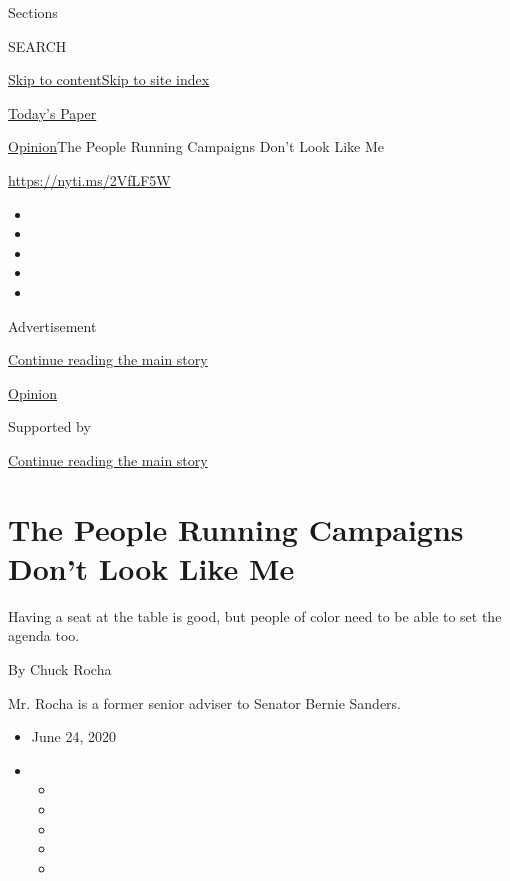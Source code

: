 Sections

SEARCH

\protect\hyperlink{site-content}{Skip to
content}\protect\hyperlink{site-index}{Skip to site index}

\href{https://myaccount.nytimes3xbfgragh.onion/auth/login?response_type=cookie\&client_id=vi}{}

\href{https://www.nytimes3xbfgragh.onion/section/todayspaper}{Today's
Paper}

\href{/section/opinion}{Opinion}\textbar{}The People Running Campaigns
Don't Look Like Me

\url{https://nyti.ms/2VfLF5W}

\begin{itemize}
\item
\item
\item
\item
\item
\end{itemize}

Advertisement

\protect\hyperlink{after-top}{Continue reading the main story}

\href{/section/opinion}{Opinion}

Supported by

\protect\hyperlink{after-sponsor}{Continue reading the main story}

\hypertarget{the-people-running-campaigns-dont-look-like-me}{%
\section{The People Running Campaigns Don't Look Like
Me}\label{the-people-running-campaigns-dont-look-like-me}}

Having a seat at the table is good, but people of color need to be able
to set the agenda too.

By Chuck Rocha

Mr. Rocha is a former senior adviser to Senator Bernie Sanders.

\begin{itemize}
\item
  June 24, 2020
\item
  \begin{itemize}
  \item
  \item
  \item
  \item
  \item
  \end{itemize}
\end{itemize}

